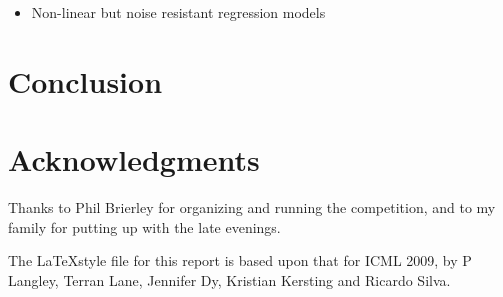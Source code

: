 \documentclass{article}
\begin{document}
\begin{itemize}
\item Non-linear but noise resistant regression models
\end{itemize}


\section{Conclusion}


\section*{Acknowledgments} 

Thanks to Phil Brierley for organizing and running the competition, and to my family for putting up with the late evenings.

The \LaTeX style file for this report is based upon that for ICML 2009, by P Langley, Terran Lane, Jennifer Dy, Kristian Kersting and Ricardo Silva.




\end{document}
